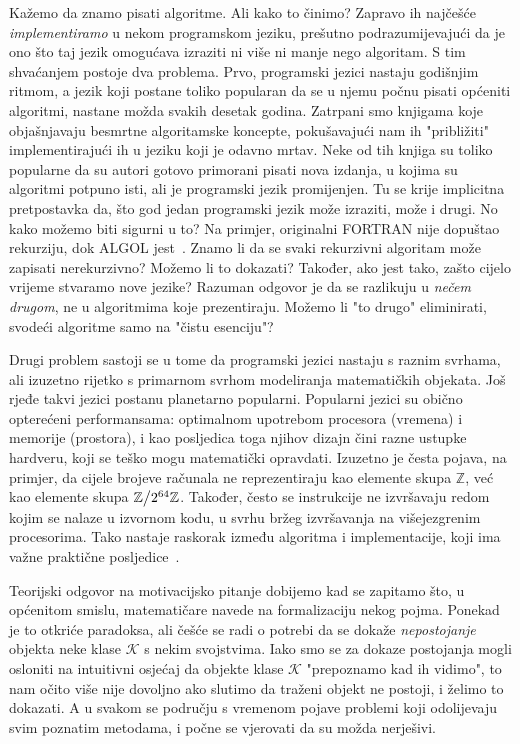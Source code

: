 Kažemo da znamo pisati algoritme. Ali kako to činimo? Zapravo ih najčešće \emph{implementiramo} u nekom programskom jeziku, prešutno podrazumijevajući da je ono što taj jezik omogućava izraziti ni više ni manje nego algoritam. S tim shvaćanjem postoje dva problema. Prvo, programski jezici nastaju godišnjim ritmom, a jezik koji postane toliko popularan da se u njemu počnu pisati općeniti algoritmi, nastane možda svakih desetak godina. Zatrpani smo knjigama koje objašnjavaju besmrtne algoritamske koncepte, pokušavajući nam ih "približiti" implementirajući ih u jeziku koji je odavno mrtav. Neke od tih knjiga su toliko popularne da su autori gotovo primorani pisati nova izdanja, u kojima su algoritmi potpuno isti, ali je programski jezik promijenjen. Tu se krije implicitna pretpostavka da, što god jedan programski jezik može izraziti, može i drugi. No kako možemo biti sigurni u to? Na primjer, originalni FORTRAN nije dopuštao rekurziju, dok ALGOL jest~\cite{url:recursionAlgol}. Znamo li da se svaki rekurzivni algoritam može zapisati nerekurzivno? Možemo li to dokazati? Također, ako jest tako, zašto cijelo vrijeme stvaramo nove jezike? Razuman odgovor je da se razlikuju u \emph{nečem drugom}, ne u algoritmima koje prezentiraju. Možemo li "to drugo" eliminirati, svodeći algoritme samo na "čistu esenciju"?

Drugi problem sastoji se u tome da programski jezici nastaju s raznim svrhama, ali izuzetno rijetko s primarnom svrhom modeliranja matematičkih objekata. Još rjeđe takvi jezici postanu planetarno popularni. Popularni jezici su obično opterećeni performansama: optimalnom upotrebom procesora (vremena) i memorije (prostora), i kao posljedica toga njihov dizajn čini razne ustupke hardveru, koji se teško mogu matematički opravdati. Izuzetno je česta pojava, na primjer, da cijele brojeve računala ne reprezentiraju kao elemente skupa $\mathbb Z$, već kao elemente skupa $\mathbb Z\big\slash2^{64}\mathbb Z$. Također, često se instrukcije ne izvršavaju redom kojim se nalaze u izvornom kodu, u svrhu bržeg izvršavanja na višejezgrenim procesorima. Tako nastaje raskorak između algoritma i implementacije, koji ima važne praktične posljedice~\cite{url:wrongBinsearch}.

Teorijski odgovor na motivacijsko pitanje dobijemo kad se zapitamo što, u općenitom smislu, matematičare navede na formalizaciju nekog pojma. Ponekad je to otkriće paradoksa, ali češće se radi o potrebi da se dokaže \emph{nepostojanje} objekta neke klase $\mathcal K$ s nekim svojstvima. Iako smo se za dokaze postojanja mogli osloniti na intuitivni osjećaj da objekte klase $\mathcal K$ "prepoznamo kad ih vidimo", to nam očito više nije dovoljno ako slutimo da traženi objekt ne postoji, i želimo to dokazati. A u svakom se području s vremenom pojave problemi koji odolijevaju svim poznatim metodama, i počne se vjerovati da su možda nerješivi.

